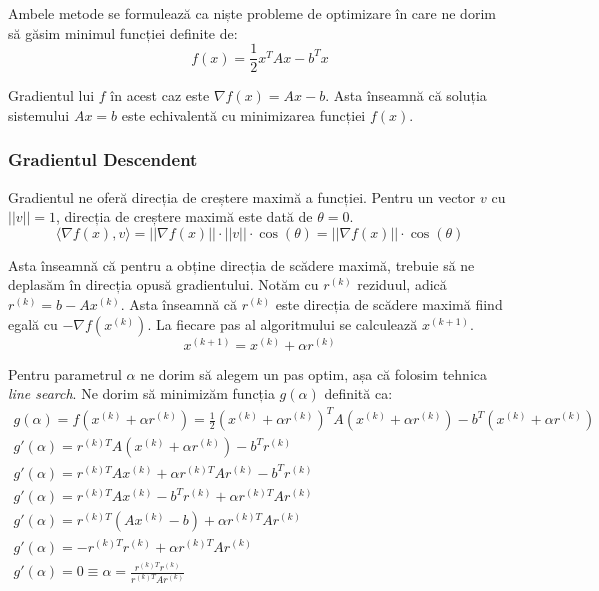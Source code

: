 \documentclass{exam}
\begin{document}
Ambele metode se formulează ca niște probleme de optimizare în care ne dorim
să găsim minimul funcției definite de:
\begin{equation*}
	f(x) = \frac{1}{2} x^T A x - b^T x
\end{equation*}

Gradientul lui $f$ în acest caz este $\nabla f(x) = Ax - b$. Asta înseamnă că
soluția sistemului $Ax = b$ este echivalentă cu minimizarea funcției $f(x)$.

\subsubsection{Gradientul Descendent}

Gradientul ne oferă direcția de creștere maximă a funcției. Pentru un vector $v$
cu $||v|| = 1$, direcția de creștere maximă este dată de $\theta = 0$.
\begin{equation*}
	\langle \nabla f(x), v \rangle = ||\nabla f(x)|| \cdot ||v|| \cdot \cos(\theta) = ||\nabla f(x)|| \cdot \cos(\theta)
\end{equation*}

Asta înseamnă că pentru a obține direcția de scădere maximă, trebuie să ne
deplasăm în direcția opusă gradientului. Notăm cu $r^{(k)}$ reziduul, adică
$r^{(k)} = b - Ax^{(k)}$. Asta înseamnă că $r^{(k)}$ este direcția de scădere
maximă fiind egală cu $-\nabla f(x^{(k)})$. La fiecare pas al algoritmului se
calculează $x^{(k + 1)}$.
\begin{equation*}
	x^{(k + 1)} = x^{(k)} + \alpha r^{(k)}
\end{equation*}

Pentru parametrul $\alpha$ ne dorim să alegem un pas optim, așa că folosim
tehnica \textit{line search}. Ne dorim să minimizăm funcția $g(\alpha)$ definită
ca:
\begin{gather*}
	g(\alpha) = f(x^{(k)} + \alpha r^{(k)}) = \frac{1}{2} (x^{(k)} + \alpha r^{(k)})^T A (x^{(k)} + \alpha r^{(k)}) - b^T (x^{(k)} + \alpha r^{(k)}) \\
	g'(\alpha) = r^{(k)T} A (x^{(k)} + \alpha r^{(k)}) - b^T r^{(k)} \\
	g'(\alpha) = r^{(k)T} A x^{(k)} + \alpha r^{(k)T} A r^{(k)} - b^T r^{(k)} \\
	g'(\alpha) = r^{(k)T} A x^{(k)} - b^T r^{(k)} + \alpha r^{(k)T} A r^{(k)} \\
	g'(\alpha) = r^{(k)T} (Ax^{(k)} - b) + \alpha r^{(k)T} A r^{(k)} \\
	g'(\alpha) = -r^{(k)T} r^{(k)} + \alpha r^{(k)T} A r^{(k)} \\
	g'(\alpha) = 0 \equiv \alpha = \frac{r^{(k)T} r^{(k)}}{r^{(k)T} A r^{(k)}}
\end{gather*}
\end{document}
